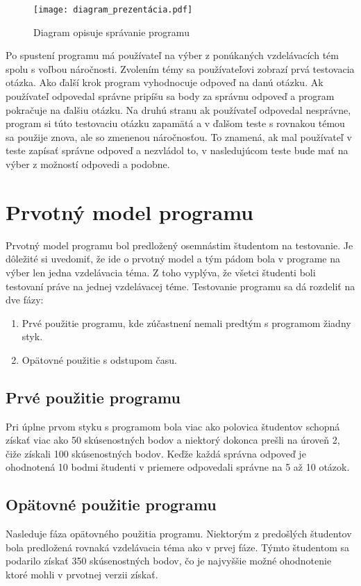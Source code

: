 \documentclass[10pt,twoside,slovak,a4paper]{article}
\begin{document}
\begin{figure}[h]
\texttt{[image: diagram\_prezentácia.pdf]}
\label{fig: diagram}
\caption{Diagram opisuje správanie programu}
\end{figure}

Po spustení programu má používateľ na výber z ponúkaných vzdelávacích tém spolu s voľbou náročnosti. Zvolením témy sa používateľovi zobrazí prvá testovacia otázka. Ako ďalší krok program vyhodnocuje odpoveď na danú otázku. Ak používateľ odpovedal správne pripíšu sa body za správnu odpoveď a program pokračuje na ďalšiu otázku. Na druhú stranu ak používateľ odpovedal nesprávne, program si túto testovaciu otázku zapamätá a v ďalšom teste s rovnakou témou sa použije znova, ale so zmenenou náročnosťou. To znamená, ak mal používateľ v teste zapísať správne odpoveď a nezvládol to, v nasledujúcom teste bude mať na výber z možností odpovedi a podobne.

\section{Prvotný model programu} \label{prototyp} 

Prvotný model programu bol predložený osemnástim študentom na testovanie. Je dôležité si uvedomiť, že ide o prvotný model a tým pádom bola v programe na výber len jedna vzdelávacia téma. Z toho vyplýva, že všetci študenti boli testovaní práve na jednej vzdelávacej téme. Testovanie programu sa dá rozdeliť na dve fázy: 

\begin{enumerate}
\item Prvé použitie programu, kde zúčastnení nemali predtým s programom žiadny styk.
\item Opätovné použitie s odstupom času.
\end{enumerate}
\subsection{Prvé použitie programu} \label{prvePouzitie}
Pri úplne prvom styku s programom bola viac ako polovica študentov schopná získať viac ako 50 skúsenostných bodov a niektorý dokonca prešli na úroveň 2, čiže získali 100 skúsenostných bodov. Keďže každá správna odpoveď je ohodnotená 10 bodmi študenti v priemere odpovedali správne na 5 až 10 otázok.

\subsection{Opätovné použitie programu} \label{dalsiePouzitie}
Nasleduje fáza opätovného použitia programu. Niektorým z predošlých študentov bola predložená rovnaká vzdelávacia téma ako v prvej fáze. 
Týmto študentom sa podarilo získať 350 skúsenostných bodov, čo je najvyššie možné ohodnotenie ktoré mohli v prvotnej verzii získať.
\end{document}
